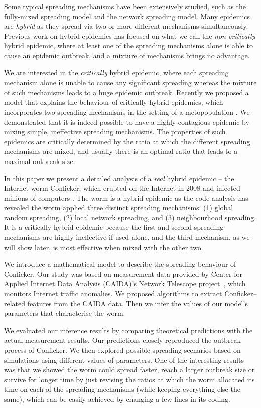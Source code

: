 \documentclass[9pt]{article}
\begin{document}
Some typical spreading mechanisms have been extensively studied, such as the {fully-mixed} spreading model and the {network} spreading model. Many epidemics are {\em hybrid} as they spread via two or more different mechanisms simultaneously.
Previous work on hybrid epidemics has focused on what we call the {\em non-critically} hybrid epidemic, where at least one of the spreading mechanisms alone is able to cause an epidemic outbreak, and a mixture of mechanisms brings no advantage. 

We are interested in the {\em critically} hybrid epidemic, where each  spreading mechanism alone is unable to cause any significant spreading whereas the mixture of such mechanisms leads to a huge epidemic outbreak. 
Recently we proposed a model that explains the behaviour of critically hybrid epidemics, which incorporates two spreading mechanisms in the setting of a metopopulation \cite{Zhang_hm_2014}. We demonstrated that it is indeed possible to have 
a highly contagious epidemic by mixing simple, ineffective spreading mechanisms. The properties of such epidemics are critically determined by the ratio at which the different spreading mechanisms are mixed, and usually there is an optimal ratio that leads to a maximal outbreak size. 

In this paper we present a detailed analysis of a {\em real} hybrid epidemic -- the Internet worm Conficker, which erupted on the Internet in 2008 and infected millions of computers . 
The worm is a hybrid epidemic as the code analysis \cite{Eric_2010} has revealed the worm applied three distinct spreading mechanisms: (1) global random spreading, (2) local network spreading, and (3) neighbourhood spreading. 
It is a critically hybrid epidemic because the first and second spreading mechanisms are highly ineffective if used alone, and the third mechanism, as we will show later, is most effective when mixed with the other two.   

We introduce a mathematical model to describe the spreading behaviour of Conficker. Our study was based on measurement data provided by Center for Applied Internet Data Analysis (CAIDA)'s Network Telescope project~\cite{CAIDA_2008_aft, CAIDA_2008_bfr}, which monitors Internet traffic anomalies. 
We proposed algorithms to extract Conficker--related features from the CAIDA data. Then we infer the values of our model's parameters that characterise the worm. 

We evaluated our inference results by comparing theoretical predictions with the actual measurement results. Our predictions closely reproduced the outbreak process of Conficker. 
We then explored possible spreading scenarios based on simulations using different values of parameters. 
One of the interesting results was that we showed the worm could spread faster, reach a larger outbreak size or survive for longer time by just revising the ratios at which the worm allocated its time on each of the spreading mechanisms (while keeping everything else the same), which can be easily achieved by changing a few lines in its coding. 
\end{document}
